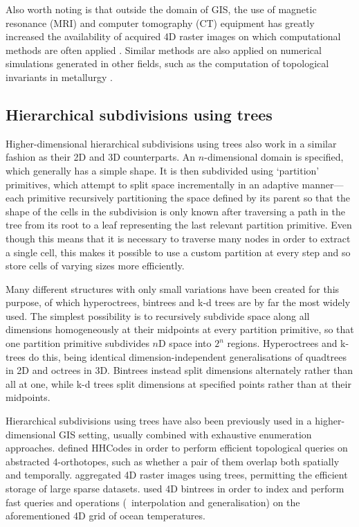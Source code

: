 Also worth noting is that outside the domain of GIS, the use of magnetic resonance (MRI) and computer tomography (CT) equipment has greatly increased the availability of acquired 4D raster images on which computational methods are often applied \citep{LorenzoValdes04}.
Similar methods are also applied on numerical simulations generated in other fields, such as the computation of topological invariants in metallurgy \citep{Kaczynski04}.

\subsection{Hierarchical subdivisions using trees}
\label{ss:hierarchical-subdivisions}

Higher-dimensional hierarchical subdivisions using trees also work in a similar fashion as their 2D and 3D counterparts.
An $n$-dimensional domain is specified, which generally has a simple shape.
It is then subdivided using `partition' primitives, which attempt to split space incrementally in an adaptive manner---each primitive recursively partitioning the space defined by its parent so that the shape of the cells in the subdivision is only known after traversing a path in the tree from its root to a leaf representing the last relevant partition primitive.
Even though this means that it is necessary to traverse many nodes in order to extract a single cell, this makes it possible to use a custom partition at every step and so store cells of varying sizes more efficiently.

Many different structures with only small variations have been created for this purpose, of which hyperoctrees, bintrees and k-d trees are by far the most widely used.
The simplest possibility is to recursively subdivide space along all dimensions homogeneously at their midpoints at every partition primitive, so that one partition primitive subdivides $n$D space into $2^n$ regions.
Hyperoctrees \citep{Yau83} and k-trees \citep{Jackins83} do this, being identical dimension-independent generalisations of quadtrees \citep{Finkel74} in 2D and octrees \citep{Meagher80} in 3D.
Bintrees \citep{Samet85} instead split dimensions alternately rather than all at one, while k-d trees split dimensions at specified points rather than at their midpoints.

Hierarchical subdivisions using trees have also been previously used in a higher-dimensional GIS setting, usually combined with exhaustive enumeration approaches.
\citet{Varma90} defined HHCodes in order to perform efficient topological queries on abstracted 4-orthotopes, such as whether a pair of them overlap both spatially and temporally.
\citet{Oconaill92} aggregated 4D raster images using trees, permitting the efficient storage of large sparse datasets.
\citet{Mason94} used 4D bintrees in order to index and perform fast queries and operations (\eg\ interpolation and generalisation) on the aforementioned 4D grid of ocean temperatures.

